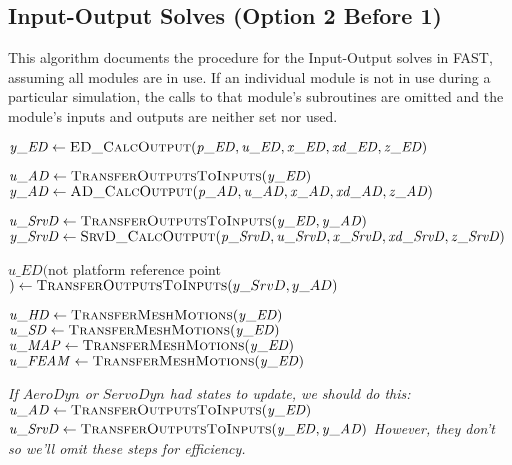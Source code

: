 \documentclass[10pt,letterpaper,oneside,notitlepage]{article}
\begin{document}
\subsection {Input-Output Solves (Option 2 Before 1)}
This algorithm documents the procedure for the Input-Output solves in FAST, assuming
all modules are in use. If an individual module is not in use during a particular
simulation, the calls to that module's subroutines are omitted and the module's 
inputs and outputs are neither set nor used.

\begin{algorithmic}[1]
\State $\mathit{y\_ED} \gets \Call{ED\_CalcOutput}{\mathit{p\_ED},\mathit{u\_ED},\mathit{x\_ED},\mathit{xd\_ED},\mathit{z\_ED}}$

\State
	\State $\mathit{u\_AD} \gets \Call{TransferOutputsToInputs}{\mathit{y\_ED}}$
	\State $\mathit{y\_AD} \gets \Call{AD\_CalcOutput}{\mathit{p\_AD},\mathit{u\_AD},\mathit{x\_AD},\mathit{xd\_AD},\mathit{z\_AD}}$

\State
	\State $\mathit{u\_SrvD} \gets \Call{TransferOutputsToInputs}{\mathit{y\_ED},\mathit{y\_AD}}$
	\State $\mathit{y\_SrvD} \gets \Call{SrvD\_CalcOutput}{\mathit{p\_SrvD},\mathit{u\_SrvD},\mathit{x\_SrvD},\mathit{xd\_SrvD},\mathit{z\_SrvD}}$

\State
	\State $\mathit{u\_ED}($not platform reference point$) \gets \Call{TransferOutputsToInputs}{y\_SrvD,y\_AD}$ %

	\State $\mathit{u\_HD}   \gets \Call{TransferMeshMotions}{\mathit{y\_ED}}$
	\State $\mathit{u\_SD}   \gets \Call{TransferMeshMotions}{\mathit{y\_ED}}$
	\State $\mathit{u\_MAP}  \gets \Call{TransferMeshMotions}{\mathit{y\_ED}}$
	\State $\mathit{u\_FEAM} \gets \Call{TransferMeshMotions}{\mathit{y\_ED}}$

\State
\State {}
\State
\textit{
\State If $AeroDyn$ or $ServoDyn$ had states to update, we should do this:
\State\hspace{\algorithmicindent} $\mathit{u\_AD} \gets \Call{TransferOutputsToInputs}{\mathit{y\_ED}}$
\State\hspace{\algorithmicindent} $\mathit{u\_SrvD} \gets \Call{TransferOutputsToInputs}{\mathit{y\_ED},\mathit{y\_AD}}$
\State However, they don't so we'll omit these steps for efficiency.
}
\EndProcedure
\end{algorithmic}
\end{document}
